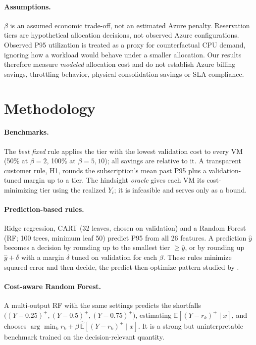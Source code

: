 \documentclass[10pt]{article}
\newcommand{\Ex}{\mathbb{E}}
\begin{document}
\paragraph{Assumptions.} $\beta$ is an assumed economic trade-off, not an estimated Azure penalty. Reservation tiers are hypothetical allocation decisions, not observed Azure configurations. Observed P95 utilization is treated as a proxy for counterfactual CPU demand, ignoring how a workload would behave under a smaller allocation. Our results therefore measure \emph{modeled} allocation cost and do not establish Azure billing savings, throttling behavior, physical consolidation savings or SLA compliance.

\section{Methodology}
\label{sec:methods}

\paragraph{Benchmarks.} The \emph{best fixed} rule applies the tier with the lowest validation cost to every VM (50\% at $\beta=2$, 100\% at $\beta=5,10$); all savings are relative to it. A transparent customer rule, H1, rounds the subscription's mean past P95 plus a validation-tuned margin up to a tier. The hindsight \emph{oracle} gives each VM its cost-minimizing tier using the realized $Y_i$; it is infeasible and serves only as a bound.

\paragraph{Prediction-based rules.} Ridge regression, CART (32 leaves, chosen on validation) and a Random Forest (RF; 100 trees, minimum leaf 50) \citep{breiman2001rf} predict P95 from all 26 features. A prediction $\hat y$ becomes a decision by rounding up to the smallest tier $\ge\hat y$, or by rounding up $\hat y+\delta$ with a margin $\delta$ tuned on validation for each $\beta$. These rules minimize squared error and then decide, the predict-then-optimize pattern studied by \citet{elmachtoub2022spo}.

\paragraph{Cost-aware Random Forest.} A multi-output RF with the same settings predicts the shortfalls $\big((Y-0.25)^+,(Y-0.5)^+,(Y-0.75)^+\big)$, estimating $\Ex[(Y-r_k)^+\mid x]$, and chooses $\arg\min_k r_k+\beta\,\widehat{\Ex}[(Y-r_k)^+\mid x]$. It is a strong but uninterpretable benchmark trained on the decision-relevant quantity.
\end{document}
